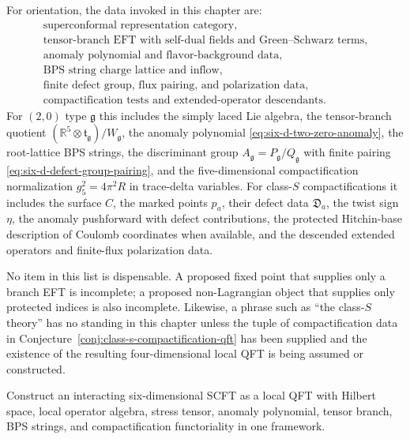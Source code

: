 For orientation, the data invoked in this chapter are:
\[
\begin{gathered}
  \text{superconformal representation category},\\
  \text{tensor-branch EFT with self-dual fields and Green--Schwarz terms},\\
  \text{anomaly polynomial and flavor-background data},\\
  \text{BPS string charge lattice and inflow},\\
  \text{finite defect group, flux pairing, and polarization data},\\
  \text{compactification tests and extended-operator descendants}.
\end{gathered}
\]
For \((2,0)\) type \(\mathfrak g\) this includes the simply laced Lie algebra,
the tensor-branch quotient
\((\mathbb R^5\otimes\mathfrak t_{\mathfrak g})/W_{\mathfrak g}\), the
anomaly polynomial \eqref{eq:six-d-two-zero-anomaly}, the root-lattice BPS
strings, the discriminant group
\(A_{\mathfrak g}=P_{\mathfrak g}/Q_{\mathfrak g}\) with finite pairing
\eqref{eq:six-d-defect-group-pairing}, and the five-dimensional
compactification normalization \(g_5^2=4\pi^2R\) in trace-delta variables.
For class-\(S\) compactifications it includes the surface \(C\), the marked
points \(p_a\), their defect data \(\mathfrak D_a\), the twist sign \(\eta\),
the anomaly pushforward with defect contributions, the protected Hitchin-base
description of Coulomb coordinates when available, and the descended extended
operators and finite-flux polarization data.

No item in this list is dispensable.  A proposed fixed point that supplies
only a branch EFT is incomplete; a proposed non-Lagrangian object that
supplies only protected indices is also incomplete.  Likewise, a phrase such
as ``the class-\(S\) theory'' has no standing in this chapter unless the
tuple of compactification data in
Conjecture~\ref{conj:class-s-compactification-qft} has been supplied and the
existence of the resulting four-dimensional local QFT is being assumed or
constructed.

\begin{openproblem}
\label{op:six-dimensional-construction}
Construct an interacting six-dimensional SCFT as a local QFT with Hilbert
space, local operator algebra, stress tensor, anomaly polynomial, tensor
branch, BPS strings, and compactification functoriality in one framework.
\end{openproblem}
